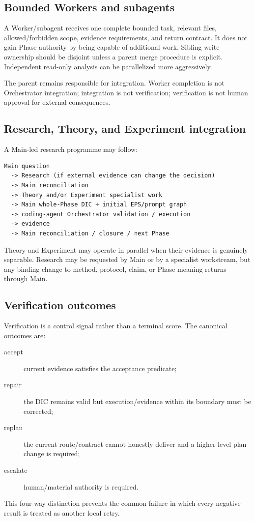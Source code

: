 \documentclass[11pt,a4paper]{article}
\begin{document}
\subsection{Bounded Workers and subagents}
A Worker/subagent receives one complete bounded task, relevant files, allowed/forbidden scope, evidence requirements, and return contract. It does not gain Phase authority by being capable of additional work. Sibling write ownership should be disjoint unless a parent merge procedure is explicit. Independent read-only analysis can be parallelized more aggressively.

The parent remains responsible for integration. Worker completion is not Orchestrator integration; integration is not verification; verification is not human approval for external consequences.

\subsection{Research, Theory, and Experiment integration}
A Main-led research programme may follow:
\begin{lstlisting}[style=workflow]
Main question
  -> Research (if external evidence can change the decision)
  -> Main reconciliation
  -> Theory and/or Experiment specialist work
  -> Main whole-Phase DIC + initial EPS/prompt graph
  -> coding-agent Orchestrator validation / execution
  -> evidence
  -> Main reconciliation / closure / next Phase
\end{lstlisting}
Theory and Experiment may operate in parallel when their evidence is genuinely separable. Research may be requested by Main or by a specialist workstream, but any binding change to method, protocol, claim, or Phase meaning returns through Main.

\subsection{Verification outcomes}
Verification is a control signal rather than a terminal score. The canonical outcomes are:
\begin{description}
\item[accept] current evidence satisfies the acceptance predicate;
\item[repair] the DIC remains valid but execution/evidence within its boundary must be corrected;
\item[replan] the current route/contract cannot honestly deliver and a higher-level plan change is required;
\item[escalate] human/material authority is required.
\end{description}
This four-way distinction prevents the common failure in which every negative result is treated as another local retry.
\end{document}
